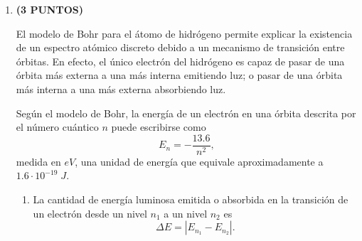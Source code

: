 \documentclass[a4paper,14pt]{extarticle}
\newcommand{\halmos}{
\vspace*{-3ex}

\begin{flushright}
\rule{1mm}{2.5mm} \end{flushright}
}
\renewcommand{\qed}{\halmos}
\begin{document}
\begin{enumerate}
    \qed
    	
    
    \newpage
    
    \item \textbf{(3 PUNTOS)} 
    
    El modelo de Bohr para el átomo de hidrógeno permite explicar la existencia de un espectro atómico discreto debido a un mecanismo de transición entre órbitas. En efecto, el único electrón del hidrógeno es capaz de pasar de una órbita más externa a una más interna emitiendo luz; o pasar de una órbita más interna a una más externa absorbiendo luz.
    
    Según el modelo de Bohr, la energía de un electrón en una órbita descrita por el número cuántico $n$ puede escribirse como
    	$$E_n=-\frac{13.6}{n^2},$$
    medida en $eV$, una unidad de energía que equivale aproximadamente a $1.6\cdot 10^{-19}\;J$.
    		
    	\begin{enumerate}[label=\alph*)]
    		\item La cantidad de energía luminosa emitida o absorbida en la transición de un electrón desde un nivel $n_1$ a un nivel $n_2$ es $$\Delta E=|E_{n_1}-E_{n_2}|.$$
    		

\end{enumerate}
\end{enumerate}
\end{document}
